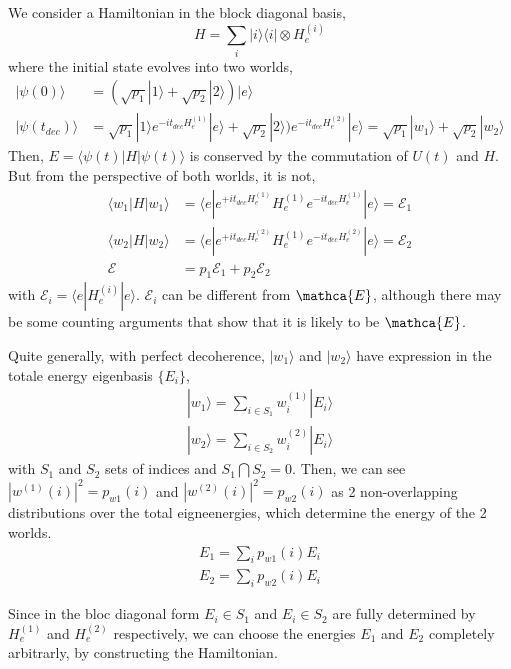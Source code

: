 \documentclass{article}
\begin{document}
We consider a Hamiltonian in the block diagonal basis, 
\begin{equation}
    H=\sum_{i}|i\rangle\langle i|\otimes H^{(i)}_e
\end{equation}
where the initial state evolves into two worlds,
\begin{align}
    |\psi(0)\rangle &=(\sqrt{p_1}|1\rangle+\sqrt{p_2}|2\rangle)|e\rangle\\
    |\psi(t_{dec})\rangle&=\sqrt{p_1}|1\rangle e^{-it_{dec}H^{(1)}_e}|e\rangle+\sqrt{p_2}|2\rangle)e^{-it_{dec}H^{(2)}_e}|e\rangle=\sqrt{p_1}|w_1\rangle+\sqrt{p_2}|w_2\rangle
\end{align}
Then, $E=\langle\psi(t)|H|\psi(t)\rangle$ is conserved by the commutation of $U(t)$ and $H$. But from the perspective of both worlds, it is not,
\begin{align}
    \langle w_1|H|w_1\rangle&=\langle e|e^{+it_{dec}H^{(1)}_e}H^{(1)}_ee^{-it_{dec}H^{(1)}_e}|e\rangle=\mathcal{E}_1\\
    \langle w_2|H|w_2\rangle&=\langle e|e^{+it_{dec}H^{(2)}_e}H^{(1)}_ee^{-it_{dec}H^{(2)}_e}|e\rangle=\mathcal{E}_2\\
        \mathcal{E}&=p_1\mathcal{E}_1+p_2\mathcal{E}_2
\label{eq:ener_non_cons}
\end{align}
with $\mathcal{E}_i=\langle e|H^{(i)}_e|e\rangle$. $\mathcal{E}_i$ can be different from $\mathca{E}$, although there may be some counting arguments that show that it is likely to be $\mathca{E}$. 

Quite generally, with perfect decoherence, $|w_1\rangle$ and $|w_2\rangle$ have expression in the totale energy eigenbasis $\{E_i\}$,
\begin{eqnarray}
    |w_1\rangle =\sum_{i\in S_1}w^{(1)}_i|E_i\rangle\\
    |w_2\rangle =\sum_{i\in S_2}w^{(2)}_i|E_i\rangle
\end{eqnarray}
with $S_1$ and $S_2$ sets of indices and $S_1\bigcap S_2=0$. Then, we can see $|w^{(1)}(i)|^2=p_{w1}(i)$ and $|w^{(2)}(i)|^2=p_{w2}(i)$ as 2 non-overlapping distributions over the total eigneenergies, which determine the energy of the 2 worlds.
\begin{eqnarray}
    E_1=\sum_ip_{w1}(i)E_i\\
    E_2=\sum_ip_{w2}(i)E_i
\end{eqnarray}

Since in the bloc diagonal form $E_i\in S_1$ and $E_i\in S_2$ are fully determined by $H_e^{(1)}$ and $H_e^{(2)}$ respectively, we can choose the energies $E_1$ and $E_2$ completely arbitrarly, by constructing the Hamiltonian.
\end{document}
